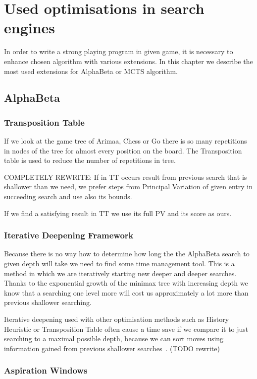 \chapter{Used optimisations in search engines}

In order to write a strong playing program in given game, it is necessary to
enhance chosen algorithm with various extensions. In this chapter we describe
the most used extensions for AlphaBeta or MCTS algorithm.

\section{AlphaBeta}
\subsection{Transposition Table}\label{AlphaBeta:TT}
If we look at the game tree of Arimaa, Chess or Go there is so many repetitions in
nodes of the tree for almost every position on the board. The Transposition table
is used to reduce the number of repetitions in tree.

COMPLETELY REWRITE: If in TT occurs result from previous search that is
shallower than we need, we prefer steps from Principal Variation of given entry
in succeeding search and use also its bounds.

If we find a satisfying result in TT we use its full PV and its score as ours.

\subsection{Iterative Deepening Framework}
Because there is no way how to determine how long the the AlphaBeta search to given
depth will take we need to find some time management tool. This is a method in
which we are iteratively starting new deeper and deeper searches. Thanks to
the exponential growth of the minimax tree with increasing depth we know that
a searching one level more will cost us approximately a lot more than previous
shallower searching.

Iterative deepening used with other optimisation methods such as History
Heuristic or Transposition Table often cause a time save if we compare it to
just searching to a maximal possible depth, because we can sort moves using
information gained from previous shallower searches~\cite{COX}. (TODO rewrite)

\subsection{Aspiration Windows}

